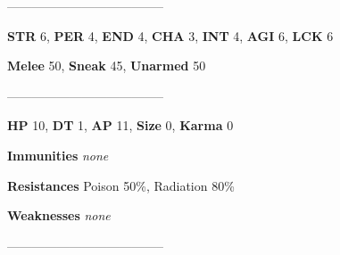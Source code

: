\documentclass[11pt,a4paper,twocolumn]{book}
\begin{document}
%		
%	
%		

	--------------------------------------
	
	\noindent
	\textbf{STR} 6, \textbf{PER} 4, \textbf{END} 4, \textbf{CHA} 3, \textbf{INT} 4, \textbf{AGI} 6, \textbf{LCK} 6
	
	\noindent
	\textbf{Melee} 50, \textbf{Sneak} 45, \textbf{Unarmed} 50
	
	--------------------------------------
	
	\noindent
	\textbf{HP} 10, \textbf{DT} 1, \textbf{AP} 11, \textbf{Size} 0, \textbf{Karma} 0
	
	
	\noindent
	\textbf{Immunities} \emph{none} %
	
	\noindent
	\textbf{Resistances} Poison 50\%, Radiation 80\%%
	
	\noindent
	\textbf{Weaknesses} \emph{none}%
	
	--------------------------------------
	
\end{document}
